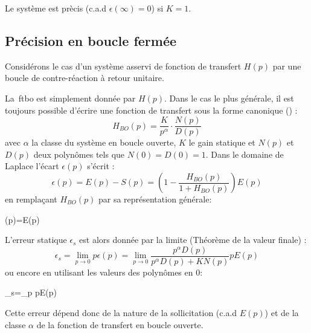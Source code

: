 Le système est prècis (c.a.d $\epsilon(\infty)=0$) si $K=1$. 
\subsection{Précision en boucle fermée}
Considérons le cas d'un système asservi de fonction de transfert $H(p)$
par une boucle de contre-réaction à retour unitaire.
\begin{center}
    
\end{center}
La~\gls{ftbo} est simplement donnée par $H(p)$. Dans le cas le plus
générale, il est toujours possible d'écrire une fonction de transfert
sous la forme canonique () :
$$
H_{BO}(p)=\dfrac{K}{p^\alpha}\cdot\dfrac{N(p)}{D(p)}
$$
avec $\alpha$ la classe du système en boucle ouverte, $K$ le gain statique et 
$N(p)$ et $D(p)$ deux polynômes tels que $N(0)=D(0)=1$. 
Dans le domaine de Laplace l'écart $\epsilon(p)$ s'écrit :
$$
\epsilon(p)=E(p)-S(p)=\left(1-\dfrac{H_{BO}(p)}{1+H_{BO}(p)}\right)E(p)
$$
en remplaçant $H_{BO}(p)$ par sa représentation générale:
\begin{bequation}
\epsilon(p)=E(p)
\end{bequation}

L'erreur statique $\epsilon_s$ est alors donnée par la limite (Théorème 
de la valeur finale) :
$$
\epsilon_s=\lim\limits_{p\to 0} p\epsilon(p)=\lim\limits_{p\to 0} 
           \dfrac{p^\alpha D(p)}{p^\alpha D(p)+KN(p)}pE(p) 
$$
ou encore en utilisant les valeurs des polynômes en 0: 
\begin{bequation}
	\epsilon_s=\lim\limits_{p} pE(p)
	\label{eq-erreurStatique}
\end{bequation}

Cette erreur dépend donc de la nature de la sollicitation (c.a.d $E(p)$) et 
de la classe $\alpha$ de la fonction de transfert en boucle ouverte.

